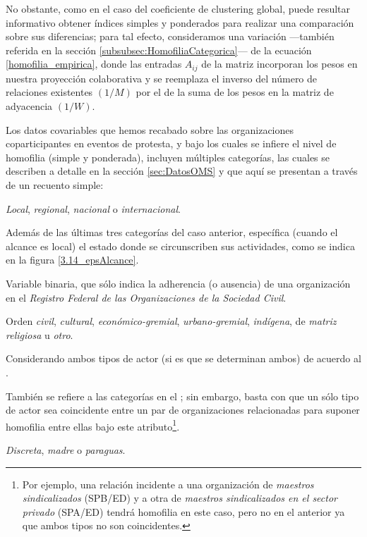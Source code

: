 \documentclass[letterpaper, 11pt]{book}
\theoremstyle{definition}
\theoremstyle{remark}
\begin{document}
No obstante, como en el caso del coeficiente de clustering global, puede resultar informativo obtener índices simples y ponderados para realizar una comparación sobre sus diferencias; para tal efecto, consideramos una variación ---también referida en la sección \ref{subsubsec:HomofiliaCategorica}--- de la ecuación \ref{homofilia_empirica}, donde las entradas $A_{ij}$ de la matriz incorporan los pesos en nuestra proyección colaborativa y se reemplaza el inverso del número de relaciones existentes $(1/M)$ por el de la suma de los pesos en la matriz de adyacencia $(1/W)$. 

Los datos covariables que hemos recabado sobre las organizaciones coparticipantes en eventos de protesta, y bajo los cuales se infiere el nivel de homofilia (simple y ponderada), incluyen múltiples categorías, las cuales se describen a detalle en la sección \ref{sec:DatosOMS} y que aquí se presentan a través de un recuento simple: 
\begin{description}
    \setlength\itemsep{0em}
    \item[Alcance:] \emph{Local}, \emph{regional}, \emph{nacional} o \emph{internacional}. 
    \item[Alcance estatal:] Además de las últimas tres categorías del caso anterior, específica (cuando el alcance es local) el estado donde se circunscriben sus actividades, como se indica en la figura \ref{3.14_epsAlcance}. 
    \item[Aparición en el RFOSC:] Variable binaria, que sólo indica la adherencia (o ausencia) de una organización en el \emph{Registro Federal de las Organizaciones de la Sociedad Civil}.
    \item[Forma organizativa:] Orden \emph{civil}, \emph{cultural}, \emph{económico-gremial}, \emph{urbano-gremial}, \emph{indígena}, de \emph{matriz religiosa} u \emph{otro}. 
    \item[Sector:] Considerando ambos tipos de actor (si es que se determinan ambos) de acuerdo al . 
    \item[Tipos de actor:] También se refiere a las categorías en el ; sin embargo, basta con que un sólo tipo de actor sea coincidente entre un par de organizaciones relacionadas para suponer homofilia entre ellas bajo este atributo\footnote{
	Por ejemplo, una relación incidente a una organización de \emph{maestros sindicalizados} (SPB/ED) y a otra de \emph{maestros sindicalizados en el sector privado} (SPA/ED) tendrá homofilia en este caso, pero no en el anterior ya que ambos tipos no son coincidentes. 
    }.
    \item[Tipo de organización:] \emph{Discreta}, \emph{madre} o \emph{paraguas}. 
\end{description}
\end{document}

